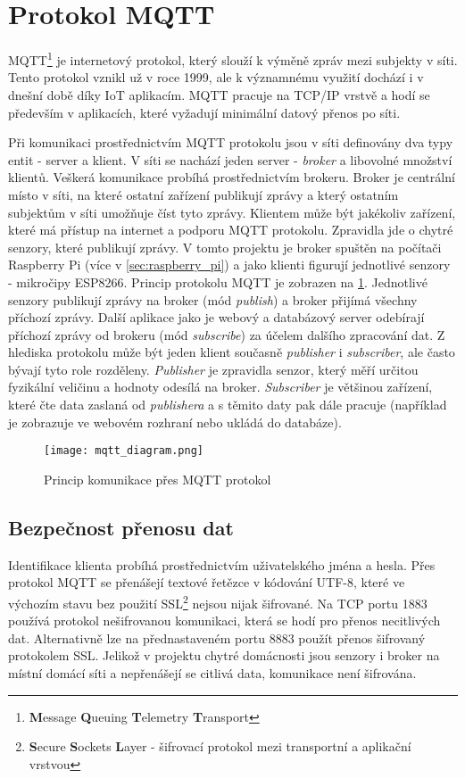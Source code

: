 \section{Protokol MQTT} \label{sec:protocol_mqtt}
MQTT\footnote{\textbf{M}essage \textbf{Q}ueuing \textbf{T}elemetry \textbf{T}ransport} je internetový protokol, který slouží k výměně zpráv mezi subjekty v síti. Tento protokol vznikl už v roce 1999, ale k významnému využití dochází i v dnešní době díky IoT aplikacím. MQTT pracuje na TCP/IP vrstvě a hodí se především v aplikacích, které vyžadují minimální datový přenos po síti.  \par
Při komunikaci prostřednictvím MQTT protokolu jsou v síti definovány dva typy entit - server a klient. V síti se nachází jeden server - \textit{broker} a libovolné množství klientů. Veškerá komunikace probíhá prostřednictvím brokeru. Broker je centrální místo v síti, na které ostatní zařízení publikují zprávy a který ostatním subjektům v síti umožňuje číst tyto zprávy. Klientem může být jakékoliv zařízení, které má přístup na internet a podporu MQTT protokolu. Zpravidla jde o chytré senzory, které publikují zprávy. V tomto projektu je broker spuštěn na počítači Raspberry Pi (více v \cref{sec:raspberry_pi}) a jako klienti figurují jednotlivé senzory - mikročipy ESP8266. Princip protokolu MQTT je zobrazen na \cref{fig:mqtt_communication}. Jednotlivé senzory publikují zprávy na broker (mód \textit{publish}) a broker přijímá všechny příchozí zprávy. Další aplikace jako je webový a databázový server odebírají příchozí zprávy od brokeru (mód \textit{subscribe}) za účelem dalšího zpracování dat. Z hlediska protokolu může být jeden klient současně \textit{publisher} i \textit{subscriber}, ale často bývají tyto role rozděleny. \textit{Publisher} je zpravidla senzor, který měří určitou fyzikální veličinu a hodnoty odesílá na broker. \textit{Subscriber} je většinou zařízení, které čte data zaslaná od \textit{publishera} a s těmito daty pak dále pracuje (například je zobrazuje ve webovém rozhraní nebo ukládá do databáze).  

\begin{figure}[H]
  \centering
  \texttt{[image: mqtt\_diagram.png]}
  \caption{Princip komunikace přes MQTT protokol}
  \label{fig:mqtt_communication}
\end{figure}

\subsection*{Bezpečnost přenosu dat}
Identifikace klienta probíhá prostřednictvím uživatelského jména a hesla. Přes protokol MQTT se přenášejí textové řetězce v kódování UTF-8, které ve výchozím stavu bez použití SSL\footnote{\textbf{S}ecure \textbf{S}ockets \textbf{L}ayer - šifrovací protokol mezi transportní a aplikační vrstvou} nejsou nijak šifrované. Na TCP portu 1883 používá protokol nešifrovanou komunikaci, která se hodí pro přenos necitlivých dat. Alternativně lze na přednastaveném portu 8883 použít přenos šifrovaný protokolem SSL. Jelikož v projektu chytré domácnosti jsou senzory i broker na místní domácí síti a nepřenášejí se citlivá data, komunikace není šifrována.

